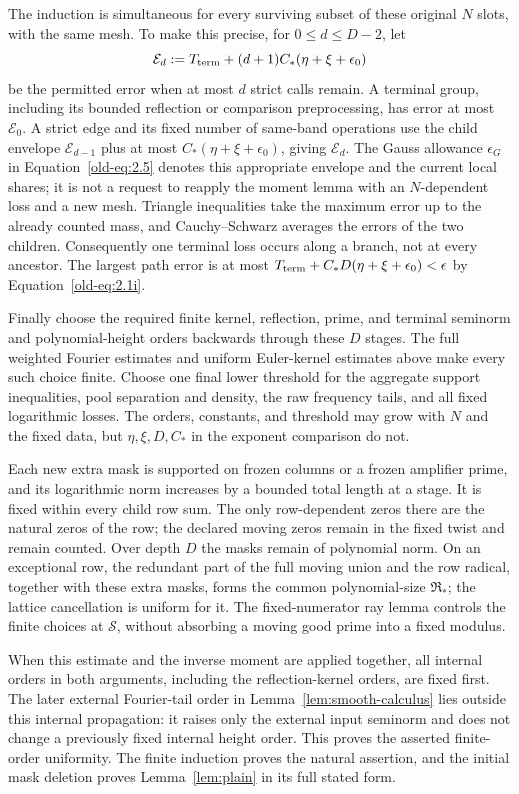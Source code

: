 \documentclass[11pt,a4paper]{article}
\numberwithin{equation}{section}
\numberwithin{figure}{section}
\theoremstyle{definition}
\theoremstyle{remark}
\begin{document}
The induction is simultaneous for every surviving subset of these
original \(N\) slots, with the same mesh.  To make this precise, for
\(0\le d\le D-2\), let
\[
 \mathcal E_d
 :=T_{\rm term}+(d+1)C_*(\eta+\xi+\epsilon_0)
\]
be the permitted error when at most \(d\) strict calls remain.
A terminal group, including its bounded reflection or comparison
preprocessing, has error at most \(\mathcal E_0\).  A strict edge
and its fixed number of same-band operations use the child envelope
\(\mathcal E_{d-1}\) plus at most
\(C_*(\eta+\xi+\epsilon_0)\), giving \(\mathcal E_d\).
The Gauss allowance \(\epsilon_G\) in
Equation~\eqref{old-eq:2.5} denotes this appropriate envelope and
the current local shares; it is not a request to reapply the moment
lemma with an \(N\)-dependent loss and a new mesh.  Triangle
inequalities take the maximum error up to the already counted mass,
and Cauchy--Schwarz averages the errors of the two children.
Consequently one terminal loss occurs along a branch, not at every
ancestor.  The largest path error is at most
\(T_{\rm term}+C_*D(\eta+\xi+\epsilon_0)<\epsilon\) by
Equation~\eqref{old-eq:2.1i}.

Finally choose the required finite kernel, reflection, prime, and
terminal seminorm and polynomial-height orders backwards through
these \(D\) stages.  The full weighted Fourier estimates and uniform
Euler-kernel estimates above make every such choice finite.  Choose
one final lower threshold for the aggregate support inequalities,
pool separation and density, the raw frequency tails, and all fixed
logarithmic losses.  The orders, constants, and threshold may grow
with \(N\) and the fixed data, but \(\eta,\xi,D,C_*\) in the
exponent comparison do not.

Each new extra mask is supported on frozen columns or a frozen
amplifier prime, and its logarithmic norm increases by a bounded
total length at a stage.  It is fixed within every child row sum.
The only row-dependent zeros there are the natural zeros of the row;
the declared moving zeros remain in the fixed twist and remain counted.
Over depth \(D\) the masks remain of polynomial norm.
On an exceptional row, the redundant part of the full moving union
and the row radical, together with these extra masks, forms the
common polynomial-size \(\mathfrak R_*\); the lattice cancellation
is uniform for it.  The fixed-numerator ray lemma controls the
finite choices at \(\mathcal S\), without absorbing a moving good
prime into a fixed modulus.

When this estimate and the inverse moment are applied together, all internal
orders in both arguments, including the reflection-kernel orders,
are fixed first.  The later external Fourier-tail order in
Lemma~\ref{lem:smooth-calculus} lies outside this internal
propagation: it raises only the external input seminorm and does
not change a previously fixed internal height order.  This proves
the asserted finite-order uniformity.  The finite induction proves
the natural assertion, and the initial mask deletion proves
Lemma~\ref{lem:plain} in its full stated form.
\end{document}
